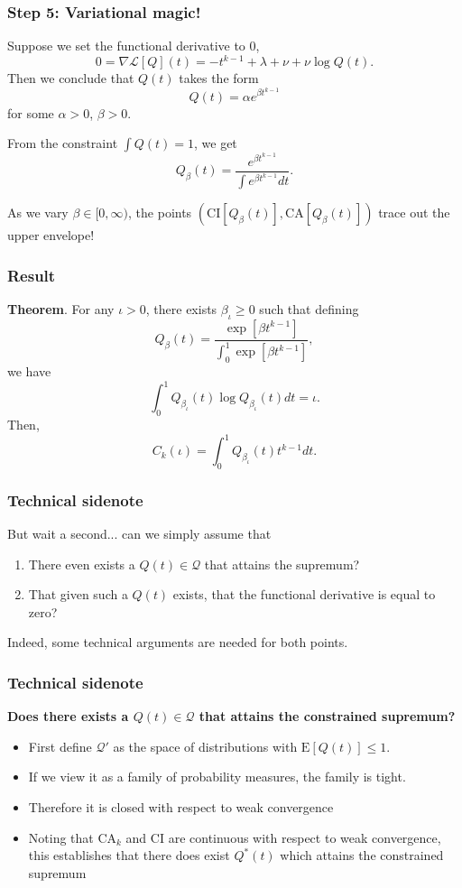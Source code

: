\documentclass{beamer}
\begin{document}
\begin{frame}
\frametitle{Step 5: Variational magic!}
Suppose we set the functional derivative to 0,
\[
0 = \nabla \mathcal{L}[Q](t) = -t^{k-1} + \lambda + \nu + \nu \log Q(t).
\]
Then we conclude that $Q(t)$ takes the form
\[
Q(t) = \alpha e^{\beta t^{k-1}}
\]
for some $\alpha > 0$, $\beta > 0$.

From the constraint $\int Q(t) = 1$, we get
\[
Q_\beta(t) = \frac{e^{\beta t^{k-1}}}{\int e^{\beta t^{k-1}} dt}.
\]

As we vary $\beta \in [0,\infty)$, the points $(\text{CI}[Q_\beta(t)], \text{CA}[Q_\beta(t)])$ trace out the upper envelope!
\end{frame}

\begin{frame}
\frametitle{Result}
\textbf{Theorem}.
For any $\iota > 0$, there exists $\beta_\iota \geq 0$ such that defining
\[
Q_\beta(t) = \frac{\exp[\beta t^{k-1}]}{\int_0^1 \exp[\beta t^{k-1}]},
\]
we have
\[
\int_0^1 Q_{\beta_\iota}(t) \log Q_{\beta_\iota}(t) dt = \iota.
\]
Then,
\[
C_k(\iota) = \int_0^1 Q_{\beta_\iota}(t) t^{k-1} dt.
\]
\end{frame}

\begin{frame}
\frametitle{Technical sidenote}
But wait a second... can we simply assume that
\begin{enumerate}
\item There even exists a $Q(t) \in \mathcal{Q}$ that attains the supremum?
\item That given such a $Q(t)$ exists, that the functional derivative is equal to zero?
\end{enumerate}
Indeed, some technical arguments are needed for both points.
\end{frame}

\begin{frame}
\frametitle{Technical sidenote}
\textbf{Does there exists a $Q(t) \in \mathcal{Q}$ that attains the constrained supremum?}

\begin{itemize}
\item First define $\mathcal{Q}'$ as the space of distributions with $\text{E}[Q(t)] \leq 1$.
\item If we view it as a family of probability measures, the family is tight.
\item Therefore it is closed with respect to weak convergence
\item Noting that $\text{CA}_k$ and $\text{CI}$ are continuous with
  respect to weak convergence, this establishes that there does exist
  $Q^*(t)$ which attains the constrained supremum
\end{itemize}
\end{frame}
\end{document}
